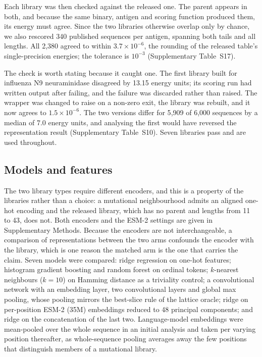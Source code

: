 \documentclass[pdflatex,sn-nature]{sn-jnl}
\theoremstyle{thmstyleone}
\theoremstyle{thmstyletwo}
\theoremstyle{thmstylethree}
\begin{document}
Each library was then checked against the released one. The parent appears in
both, and because the same binary, antigen and scoring function produced them,
its energy must agree. Since the two libraries otherwise overlap only by
chance, we also rescored 340 published sequences per antigen, spanning both
tails and all lengths. All 2{,}380 agreed to within $3.7\times10^{-6}$, the
rounding of the released table's single-precision energies; the tolerance is
$10^{-3}$ (Supplementary Table~S17).

The check is worth stating because it caught one. The first library built for
influenza N9 neuraminidase disagreed by 13.15 energy units; its scoring run had
written output after failing, and the failure was discarded rather than raised.
The wrapper was changed to raise on a non-zero exit, the library was rebuilt,
and it now agrees to $1.5\times10^{-6}$. The two versions differ for 5{,}909 of
6{,}000 sequences by a median of 7.0 energy units, and analysing the first would
have reversed the representation result (Supplementary Table~S10). Seven
libraries pass and are used throughout.

\subsection*{Models and features}

The two library types require different encoders, and this is a property of the
libraries rather than a choice: a mutational neighbourhood admits an aligned
one-hot encoding and the released library, which has no parent and lengths from
11 to 43, does not. Both encoders and the ESM-2 settings are given in
Supplementary Methods. Because the encoders are not interchangeable, a
comparison of representations between the two arms confounds the encoder with
the library, which is one reason the matched arm is the one that carries the
claim. Seven models were compared:
ridge regression on one-hot
features; histogram gradient boosting and random forest on ordinal tokens;
$k$-nearest neighbours ($k = 10$) on Hamming distance as a triviality control;
a convolutional network with an embedding layer, two convolutional layers and
global max pooling, whose pooling mirrors the best-slice rule of the lattice
oracle; ridge on per-position ESM-2 (35M) embeddings reduced to 48 principal
components; and ridge on the concatenation of the last two. Language-model
embeddings were mean-pooled over the whole sequence in an initial analysis and
taken per varying position thereafter, as whole-sequence pooling averages away
the few positions that distinguish members of a mutational library.
\end{document}
